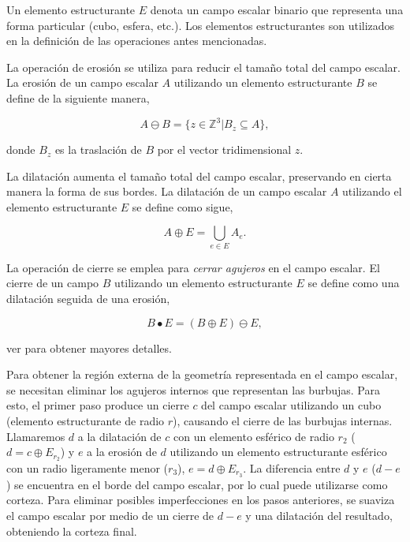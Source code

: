 Un elemento estructurante $E$ denota un campo escalar binario que representa una forma particular (cubo, esfera, etc.).
Los elementos estructurantes son utilizados en la definición de las operaciones antes mencionadas.

La operación de erosión se utiliza para reducir el tamaño total del campo escalar.
La erosión de un campo escalar $A$ utilizando un elemento estructurante $B$ se define de la siguiente manera,

\begin{equation}
A \ominus B = \{z\in \mathbb{Z}^3 | B_{z} \subseteq A\},
\end{equation}

\noindent donde $B_{z}$ es la traslación de $B$ por el vector tridimensional $z$.

La dilatación aumenta el tamaño total del campo escalar, preservando en cierta manera la forma de sus bordes.
La dilatación de un campo escalar $A$ utilizando el elemento estructurante $E$ se define como sigue,

\begin{equation}
A  \oplus E = \bigcup_{e\in E} A_e.
\end{equation}

La operación de cierre se emplea para {\em cerrar agujeros} en el campo escalar.
El cierre de un campo $B$ utilizando un elemento estructurante $E$ se define como una dilatación seguida de una erosión,

\begin{equation}
B \bullet E = (B \oplus E) \ominus E,
\end{equation}

\noindent ver \cite{Gonzalez2001} para obtener mayores detalles.

Para obtener la región externa de la geometría representada en el campo escalar, se necesitan eliminar los agujeros internos que representan las burbujas.
Para esto, el primer paso produce un cierre $c$ del campo escalar utilizando un cubo (elemento estructurante de radio $r$), causando el cierre de las burbujas internas.
Llamaremos $d$ a la dilatación de $c$ con un elemento esférico de radio $r_{2}$ ($d = c \oplus E_{r_{2}}$) y $e$ a la erosión de $d$ utilizando un elemento estructurante esférico con un radio ligeramente menor ($r_{3}$), $e = d \oplus E_{r_{3}}$.
La diferencia entre $d$ y $e$ ($d-e$) se encuentra en el borde del campo escalar, por lo cual puede utilizarse como corteza.
Para eliminar posibles imperfecciones en los pasos anteriores, se suaviza el campo escalar por medio de un cierre de $d-e$ y una dilatación del resultado, obteniendo la corteza final.


